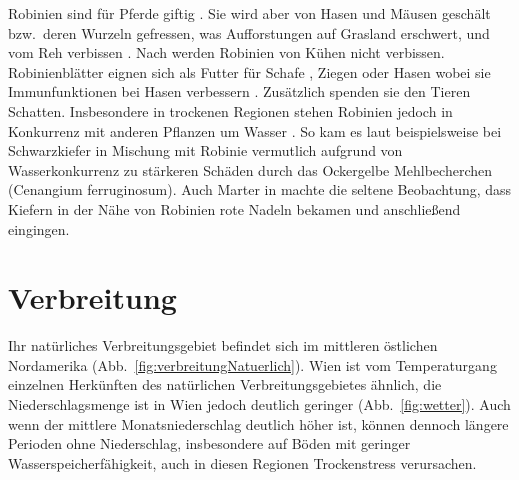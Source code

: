 \documentclass[twocolumn]{scrartcl}
\begin{document}
Robinien sind für Pferde giftig \citep{grosche2008robiniePferd}. Sie
wird aber von Hasen und Mäusen geschält bzw.\ deren Wurzeln gefressen,
was Aufforstungen auf Grasland erschwert, und vom Reh verbissen
\citep{barta2023robinieReh}. Nach \citet{berner2018robinie} werden
Robinien von Kühen nicht verbissen. Robinienblätter eignen sich als
Futter für Schafe \citep{ganai2009robnieSchaf}, Ziegen
\citep{papachristou1999robinieZiege} oder Hasen
\citep{singh2010robnieHasennahrung} wobei sie Immunfunktionen bei
Hasen verbessern \citep{yang2017robinieHasen}. Zusätzlich spenden sie
den Tieren Schatten. Insbesondere in trockenen Regionen stehen
Robinien jedoch in Konkurrenz mit anderen Pflanzen um Wasser
\citep{halasz2021robinieAlsTierutter}. So kam es laut
\citet[S.~96]{donaubauer1974kiefernsterben} beispielsweise bei
Schwarzkiefer in Mischung mit Robinie vermutlich aufgrund von
Wasserkonkurrenz zu stärkeren Schäden durch das Ockergelbe
Mehlbecherchen (Cenangium ferruginosum).  Auch Marter in
\citet[S.~93]{erteld1952robinieErtrag} machte die seltene Beobachtung,
dass Kiefern in der Nähe von Robinien rote Nadeln bekamen und
anschließend eingingen.

\section{Verbreitung}

Ihr natürliches Verbreitungsgebiet
befindet sich im mittleren östlichen Nordamerika
(Abb.~\ref{fig:verbreitungNatuerlich}). Wien ist vom Temperaturgang einzelnen
Herkünften des natürlichen Verbreitungsgebietes ähnlich, die Niederschlagsmenge
ist in Wien jedoch deutlich geringer (Abb.~\ref{fig:wetter}). Auch wenn der
mittlere Monatsniederschlag deutlich höher ist, können dennoch längere Perioden
ohne Niederschlag, insbesondere auf Böden mit geringer Wasserspeicherfähigkeit,
auch in diesen Regionen Trockenstress verursachen.
\end{document}
